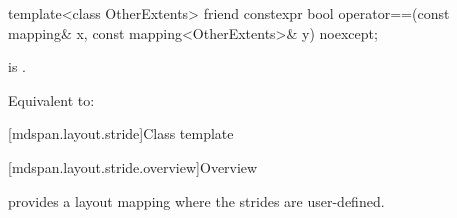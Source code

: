 %
\begin{itemdecl}
template<class OtherExtents>
  friend constexpr bool operator==(const mapping& x, const mapping<OtherExtents>& y) noexcept;
\end{itemdecl}

\begin{itemdescr}
\pnum
\constraints
{} is .

\pnum
\effects
Equivalent to: 
\end{itemdescr}

[mdspan.layout.stride]{Class template }

[mdspan.layout.stride.overview]{Overview}

\pnum
{} provides a layout mapping
where the strides are user-defined.

